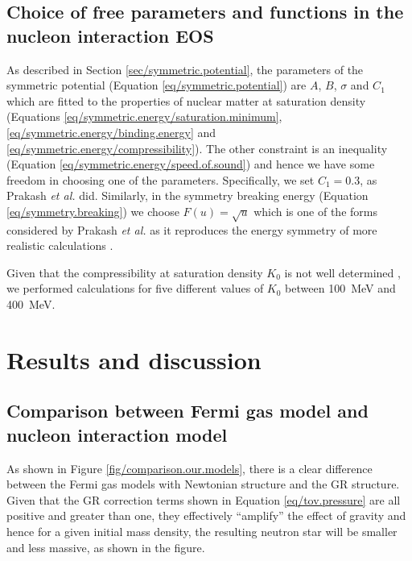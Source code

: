 \documentclass[draft,11pt]{article}
\theoremstyle{definition}
\theoremstyle{remark}
\begin{document}
        \subsection{Choice of free parameters and functions in the nucleon interaction EOS}
            As described in Section \ref{sec/symmetric.potential}, the parameters of the symmetric potential (Equation \ref{eq/symmetric.potential}) are $A$, $B$, $\sigma$ and $C_{1}$ which are fitted to the properties of nuclear matter at saturation density (Equations \ref{eq/symmetric.energy/saturation.minimum}, \ref{eq/symmetric.energy/binding.energy} and \ref{eq/symmetric.energy/compressibility}). The other constraint is an inequality (Equation \ref{eq/symmetric.energy/speed.of.sound}) and hence we have some freedom in choosing one of the parameters. Specifically, we set $C_{1}=0.3$, as Prakash \emph{et al.} \parencite{prakash.ainsworth.lattimer.1988/eos} did. Similarly, in the symmetry breaking energy (Equation \ref{eq/symmetry.breaking}) we choose $F(u)=\sqrt{u}$ which is one of the forms considered by Prakash \emph{et al.} as it reproduces the energy symmetry of more realistic calculations \parencite{prakash.ainsworth.lattimer.1988/eos}.
            
            Given that the compressibility at saturation density $K_{0}$ is not well determined \parencite{silbar.reddy.2004/neutron.stars}, we performed calculations for five different values of $K_{0}$ between \SI{100}{\mega\electronvolt} and \SI{400}{\mega\electronvolt}.
    
    \section{Results and discussion}
        \subsection{Comparison between Fermi gas model and nucleon interaction model}
            As shown in Figure \ref{fig/comparison.our.models}, there is a clear difference between the Fermi gas models with Newtonian structure and the GR structure. Given that the GR correction terms shown in Equation \ref{eq/tov.pressure} are all positive and greater than one, they effectively ``amplify'' the effect of gravity \parencite{silbar.reddy.2004/neutron.stars} and hence for a given initial mass density, the resulting neutron star will be smaller and less massive, as shown in the figure.
            
\end{document}
